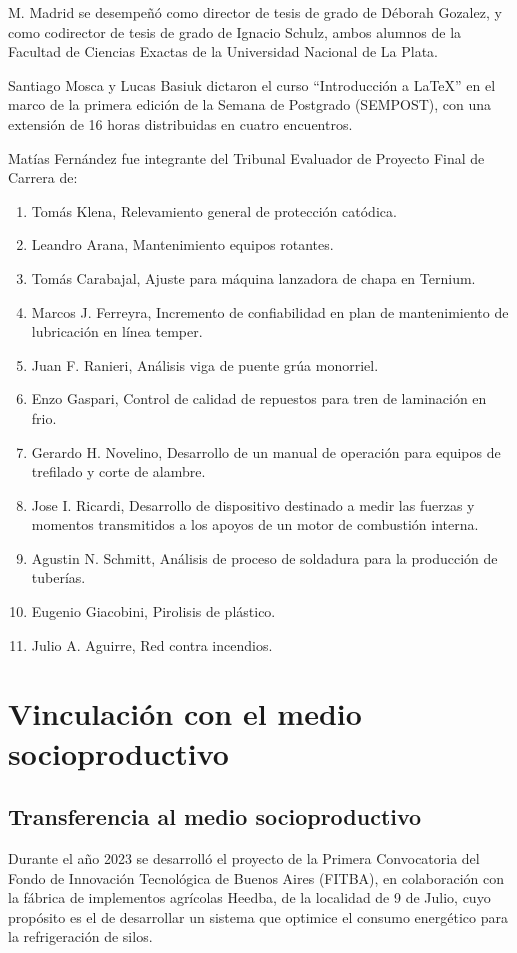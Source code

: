 \documentclass[a4paper,11pt,twoside,final,titlepage,onecolumn,openright]{report}
\begin{document}
M. Madrid se desempeñó como director de tesis de grado de Déborah Gozalez, y como codirector de tesis de grado de Ignacio Schulz, ambos alumnos de la Facultad de Ciencias Exactas de la Universidad Nacional de La Plata.

Santiago Mosca y Lucas Basiuk dictaron el curso ``Introducción a \LaTeX'' en el marco de la primera edición de la Semana de Postgrado (SEMPOST), con una extensión de 16 horas distribuidas en cuatro encuentros.

Matías Fernández fue integrante del Tribunal Evaluador de Proyecto Final de Carrera de:
\begin{enumerate}
\item Tomás Klena, Relevamiento general de protección catódica.
\item Leandro Arana, Mantenimiento equipos rotantes.
\item Tomás Carabajal, Ajuste para máquina lanzadora de chapa en Ternium.
\item Marcos J. Ferreyra, Incremento de confiabilidad en plan de mantenimiento de lubricación en línea temper.
\item Juan F. Ranieri, Análisis viga de puente grúa monorriel.
\item Enzo Gaspari, Control de calidad de repuestos para tren de laminación en frio.
\item Gerardo H. Novelino, Desarrollo de un manual de operación para equipos de trefilado y corte de alambre.
\item Jose I. Ricardi, Desarrollo de dispositivo destinado a medir las fuerzas y momentos transmitidos a los apoyos de un motor de combustión interna.
\item Agustin N. Schmitt, Análisis de proceso de soldadura para la producción de tuberías.
\item Eugenio Giacobini, Pirolisis de plástico.
\item Julio A. Aguirre, Red contra incendios.
\end{enumerate}

\chapter{Vinculación con el medio socioproductivo}

\section{Transferencia al medio socioproductivo}

Durante el año 2023 se desarrolló el proyecto de la Primera Convocatoria del Fondo de Innovación Tecnológica de Buenos Aires (FITBA), en colaboración con la fábrica de implementos agrícolas Heedba, de la localidad de 9 de Julio, cuyo propósito es el de desarrollar un sistema que optimice el consumo energético para la refrigeración de silos. 
\end{document}
